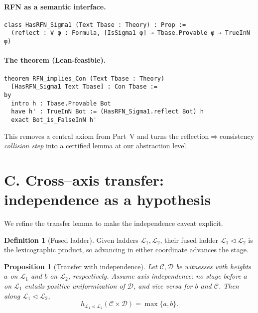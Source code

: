 \documentclass[11pt]{article}
\newtheorem{proposition}[theorem]{Proposition}
\theoremstyle{definition}
\newtheorem{definition}[theorem]{Definition}
\theoremstyle{remark}
\begin{document}
\paragraph{RFN as a semantic interface.}
\begin{verbatim}
class HasRFN_Sigma1 (Text Tbase : Theory) : Prop :=
  (reflect : ∀ φ : Formula, [IsSigma1 φ] → Tbase.Provable φ → TrueInN φ)
\end{verbatim}

\paragraph{The theorem (Lean‑feasible).}
\begin{verbatim}
theorem RFN_implies_Con (Text Tbase : Theory)
  [HasRFN_Sigma1 Text Tbase] : Con Tbase :=
by
  intro h : Tbase.Provable Bot
  have h' : TrueInN Bot := (HasRFN_Sigma1.reflect Bot) h
  exact Bot_is_FalseInN h'
\end{verbatim}

\noindent
This removes a central axiom from Part~V and turns the reflection\(\Rightarrow\)consistency \emph{collision step} into a certified lemma at our abstraction level.

\section{C. Cross–axis transfer: independence as a hypothesis}

We refine the transfer lemma to make the independence caveat explicit.

\begin{definition}[Fused ladder]
Given ladders $\mathcal L_1,\mathcal L_2$, their fused ladder $\mathcal L_1\triangleleft\mathcal L_2$ is the lexicographic product, so advancing in either coordinate advances the stage.
\end{definition}

\begin{proposition}[Transfer with independence]\label{VI:prop:transfer-indep}
Let $\mathcal C,\mathcal D$ be witnesses with heights $a$ on $\mathcal L_1$ and $b$ on $\mathcal L_2$, respectively. Assume \emph{axis independence}: no stage before $a$ on $\mathcal L_1$ entails positive uniformization of $\mathcal D$, and vice versa for $b$ and $\mathcal C$. Then along $\mathcal L_1\triangleleft\mathcal L_2$,
\[
h_{\mathcal L_1\triangleleft\mathcal L_2}(\mathcal C\times \mathcal D)=\max\{a,b\}.
\]
\end{proposition}
\end{document}
